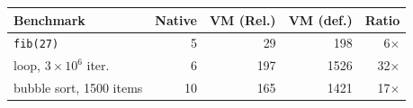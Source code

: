 \begin{tabular}{lrrrr}
\toprule
Benchmark & Native & VM (Rel.) & VM (def.) & Ratio \\
\midrule
\texttt{fib(27)} & 5 & 29 & 198 & 6$\times$ \\
loop, $3\times10^{6}$ iter. & 6 & 197 & 1526 & 32$\times$ \\
bubble sort, 1500 items & 10 & 165 & 1421 & 17$\times$ \\
\bottomrule
\end{tabular}
